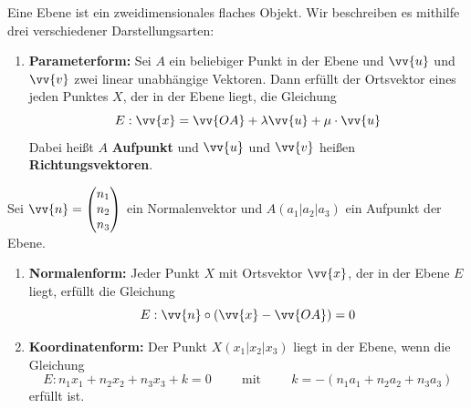 \documentclass[ngerman, 12pt]{nssheetxea}
\begin{document}
\begin{definition} 
Eine Ebene ist ein zweidimensionales flaches Objekt. Wir beschreiben es mithilfe drei verschiedener Darstellungsarten:
\begin{enumerate}
\item \textbf{Parameterform:} Sei $A$ ein beliebiger Punkt in der Ebene und $\vv{u}$ und $\vv{v}$ zwei linear unabhängige Vektoren. Dann erfüllt der Ortsvektor eines jeden Punktes $X$, der in der Ebene liegt, die Gleichung
\[ E:\vv{x}=\vv{OA}+\lambda \vv{u} + \mu \cdot \vv{u} \]
Dabei heißt $A$ \textbf{Aufpunkt} und $\vv{u}$ und $\vv{v}$ heißen \textbf{Richtungsvektoren}.

\end{enumerate}
Sei $\vv{n}=\colvec[n_1]{n_2}{n_3}$ ein Normalenvektor und $A(a_1|a_2|a_3)$ ein Aufpunkt der Ebene. 
\begin{enumerate}[resume]
\item \textbf{Normalenform:} Jeder Punkt $X$ mit Ortsvektor $\vv{x}$, der in der Ebene $E$ liegt, erfüllt die Gleichung
\[ E:\vv{n}\circ \mleft( \vv{x} - \vv{OA} \mright) = 0  \]
\item \textbf{Koordinatenform:} Der Punkt $X(x_1|x_2|x_3)$ liegt in der Ebene, wenn die Gleichung
\[ E:n_1x_1+n_2x_2+n_3x_3 + k = 0 \hspace{1cm} \text{mit} \hspace{1cm} k = -(n_1a_1+n_2a_2+n_3a_3)\]
erfüllt ist.
\end{enumerate}
\begin{center}
\end{center}
\end{definition}
\end{document}

